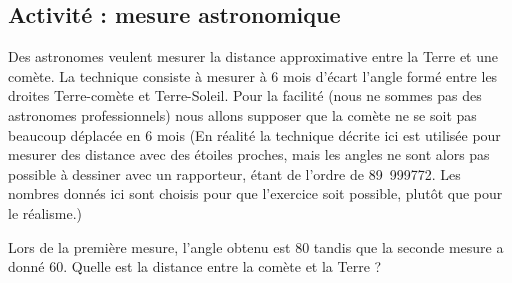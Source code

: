 
\subsection*{Activité : mesure astronomique}

Des astronomes veulent mesurer la distance approximative entre la Terre et une comète. La technique consiste à mesurer à \( 6\) mois d'écart l'angle formé entre les droites Terre-comète et Terre-Soleil. Pour la facilité (nous ne sommes pas des astronomes professionnels) nous allons supposer que la comète ne se soit pas beaucoup déplacée en \( 6\) mois%
(En réalité la technique décrite ici est utilisée pour mesurer des distance avec des étoiles proches, mais les angles ne sont alors pas possible à dessiner avec un rapporteur, étant de l'ordre de \unit{89.999772}{\degree}. Les nombres donnés ici sont choisis pour que l'exercice soit possible, plutôt que pour le réalisme.)

Lors de la première mesure, l'angle obtenu est \unit{80}{\degree} tandis que la seconde mesure a donné \unit{60}{\degree}. Quelle est la distance entre la comète et la Terre ?
